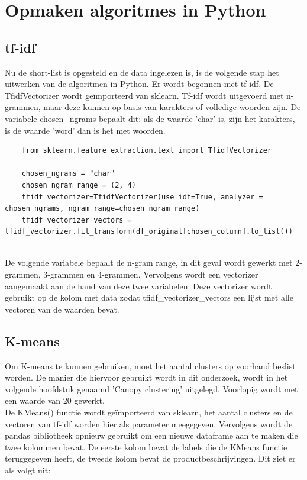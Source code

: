 \section{Opmaken algoritmes in Python}


\subsection{tf-idf}
Nu de short-list is opgesteld en de data ingelezen is, is de volgende stap het uitwerken van de algoritmen in Python. Er wordt begonnen met tf-idf. De TfidfVectorizer wordt geïmporteerd van sklearn. Tf-idf wordt uitgevoerd met n-grammen, maar deze kunnen op basis van karakters of volledige woorden zijn. De variabele chosen\_ngrams bepaalt dit: als de waarde 'char' is, zijn het karakters, is de waarde 'word' dan is het met woorden.
\\\indent
\begin{lstlisting}
    from sklearn.feature_extraction.text import TfidfVectorizer

    chosen_ngrams = "char"
    chosen_ngram_range = (2, 4)
    tfidf_vectorizer=TfidfVectorizer(use_idf=True, analyzer = chosen_ngrams, ngram_range=chosen_ngram_range)
    tfidf_vectorizer_vectors = tfidf_vectorizer.fit_transform(df_original[chosen_column].to_list())
\end{lstlisting}
\\\indent
 De volgende variabele bepaalt de n-gram range, in dit geval wordt gewerkt met 2-grammen, 3-grammen en 4-grammen. Vervolgens wordt een vectorizer aangemaakt aan de hand van deze twee variabelen. Deze vectorizer wordt gebruikt op de kolom met data zodat tfidf\_vectorizer\_vectors een lijst met alle vectoren van de waarden bevat.




\subsection{K-means}
Om K-means te kunnen gebruiken, moet het aantal clusters op voorhand beslist worden. De manier die hiervoor gebruikt wordt in dit onderzoek, wordt in het volgende hoofdstuk genaamd 'Canopy clustering' uitgelegd. Voorlopig wordt met een waarde van 20 gewerkt.
\\\indent
De KMeans() functie wordt geïmporteerd van sklearn, het aantal clusters en de vectoren van tf-idf worden hier als parameter meegegeven. Vervolgens wordt de pandas bibliotheek opnieuw gebruikt om een nieuwe dataframe aan te maken die twee kolommen bevat. De eerste kolom bevat de labels die de KMeans functie teruggegeven heeft, de tweede kolom bevat de productbeschrijvingen. Dit ziet er als volgt uit:

